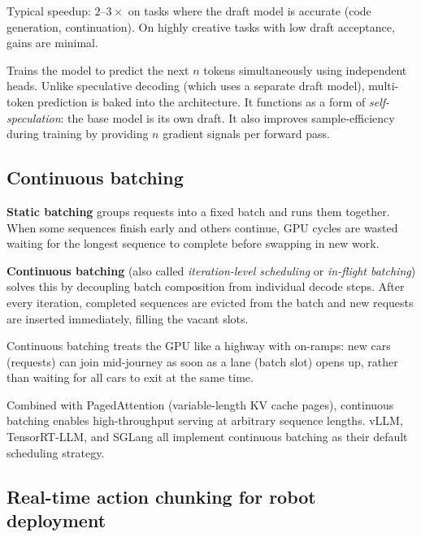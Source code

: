 Typical speedup: $2$--$3\times$ on tasks where the draft model is accurate (code
generation, continuation). On highly creative tasks with low draft acceptance, gains are
minimal.

\begin{paperbox}[title={Multi-token Prediction (Gloeckle et al.\ 2024)}]
  Trains the model to predict the next $n$ tokens simultaneously using independent
  heads. Unlike speculative decoding (which uses a separate draft model), multi-token
  prediction is baked into the architecture. It functions as a form of
  \emph{self-speculation}: the base model is its own draft. It also improves
  sample-efficiency during training by providing $n$ gradient signals per forward pass.
\end{paperbox}

\subsection{Continuous batching}

\textbf{Static batching} groups requests into a fixed batch and runs them together.
When some sequences finish early and others continue, GPU cycles are wasted waiting for
the longest sequence to complete before swapping in new work.

\textbf{Continuous batching} (also called \emph{iteration-level scheduling} or
\emph{in-flight batching}) solves this by decoupling batch composition from individual
decode steps. After every iteration, completed sequences are evicted from the batch and
new requests are inserted immediately, filling the vacant slots.

\begin{intuitionbox}
  Continuous batching treats the GPU like a highway with on-ramps: new cars (requests)
  can join mid-journey as soon as a lane (batch slot) opens up, rather than waiting for
  all cars to exit at the same time.
\end{intuitionbox}

Combined with PagedAttention (variable-length KV cache pages), continuous batching
enables high-throughput serving at arbitrary sequence lengths. vLLM, TensorRT-LLM, and
SGLang all implement continuous batching as their default scheduling strategy.

\subsection{Real-time action chunking for robot deployment}

